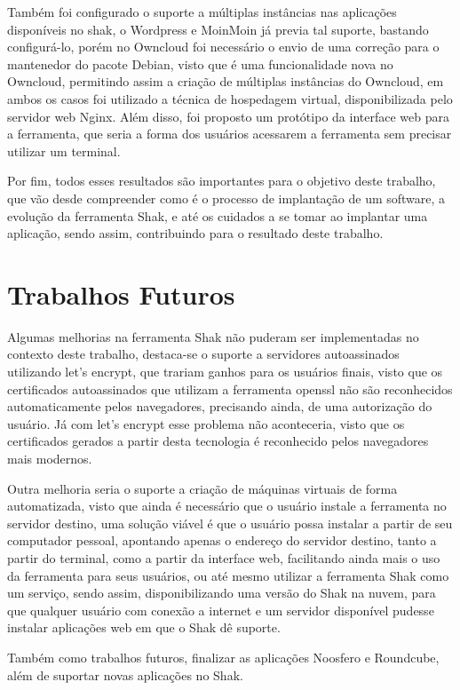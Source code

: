 Também foi configurado o suporte a múltiplas instâncias nas aplicações disponíveis
no shak, o Wordpress e MoinMoin já previa tal suporte, bastando configurá-lo, porém no Owncloud
foi necessário o envio de uma correção para o mantenedor do pacote Debian, visto que
é uma funcionalidade nova no Owncloud, permitindo assim a criação de múltiplas
instâncias do Owncloud, em ambos os casos foi utilizado a técnica de hospedagem
virtual, disponibilizada pelo servidor web Nginx. Além disso, foi proposto um protótipo
da interface web para a ferramenta, que seria a forma dos usuários acessarem a
ferramenta sem precisar utilizar um terminal.

Por fim, todos esses resultados são importantes para o objetivo deste trabalho, que vão
desde compreender como é o processo de implantação de um software, a evolução
da ferramenta Shak, e até os cuidados
a se tomar ao implantar uma aplicação, sendo assim, contribuindo para o resultado
deste trabalho.

\section{Trabalhos Futuros}
%
Algumas melhorias na ferramenta Shak não puderam ser implementadas  no contexto
deste trabalho, destaca-se o suporte a servidores autoassinados utilizando
let's encrypt, que trariam ganhos para os usuários finais, visto que os certificados
autoassinados que utilizam a ferramenta openssl não são reconhecidos automaticamente
pelos navegadores, precisando ainda, de uma autorização do usuário. Já
com let's encrypt esse problema não aconteceria, visto que os certificados
gerados a partir desta tecnologia é reconhecido pelos navegadores mais modernos.

Outra melhoria seria o suporte a criação de máquinas virtuais de forma automatizada, visto
que ainda é necessário que o usuário instale a ferramenta no servidor destino, uma
solução viável é que o usuário possa instalar a partir de seu computador pessoal,
 apontando apenas o endereço do servidor destino, tanto a partir do terminal, como
a partir da interface web, facilitando ainda mais o uso da ferramenta para seus usuários, ou
até mesmo utilizar a ferramenta Shak como um serviço, sendo assim, disponibilizando uma
versão do Shak na nuvem, para que qualquer usuário com conexão a internet e um servidor
disponível pudesse instalar aplicações web em que o Shak dê suporte.

Também como trabalhos futuros, finalizar as aplicações Noosfero e Roundcube, além
de suportar novas aplicações no Shak.
